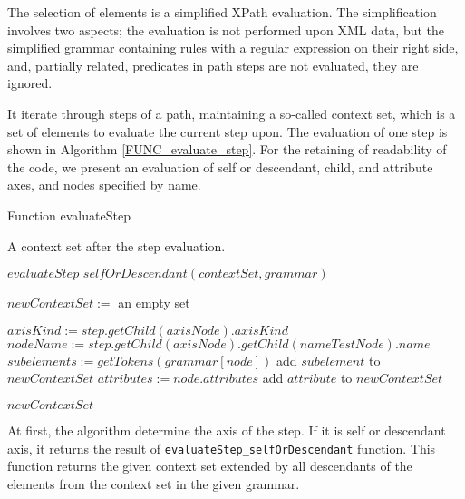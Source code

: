 The selection of elements is a simplified XPath evaluation. The simplification involves two aspects; the evaluation is not performed upon XML data, but the simplified grammar containing rules with a regular expression on their right side, and, partially related, predicates in path steps are not evaluated, they are ignored.

It iterate through steps of a path, maintaining a so-called context set, which is a set of elements to evaluate the current step upon. The evaluation of one step is shown in Algorithm \ref{FUNC_evaluate_step}. For the retaining of readability of the code, we present an evaluation of self or descendant, child, and attribute axes, and nodes specified by name.

\begin{algorithm}
\caption{Function evaluateStep}
\label{FUNC_evaluate_step}
\begin{algorithmic}[1]

\ENSURE A context set after the step evaluation.

	\RETURN $evaluateStep\_selfOrDescendant(contextSet, grammar)$
\ENDIF

\STATE $newContextSet :=$ an empty set

\STATE $axisKind := step.getChild(axisNode).axisKind$
\STATE $nodeName := step.getChild(axisNode).getChild(nameTestNode).name$
			\STATE $subelements := getTokens(grammar[node])$
					\STATE add $subelement$ to $newContextSet$
				\ENDIF
			\ENDFOR
		\ENDIF
	\ENDFOR
{}
			\STATE $attributes := node.attributes$
					\STATE add $attribute$ to $newContextSet$
				\ENDIF
			\ENDFOR
		\ENDIF
	\ENDFOR
\ENDIF

\RETURN $newContextSet$
\end{algorithmic}
\end{algorithm}

At first, the algorithm determine the axis of the step. If it is self or descendant axis, it returns the result of \texttt{evaluateStep\_selfOrDescendant} function. This function returns the given context set extended by all descendants of the elements from the context set in the given grammar.

